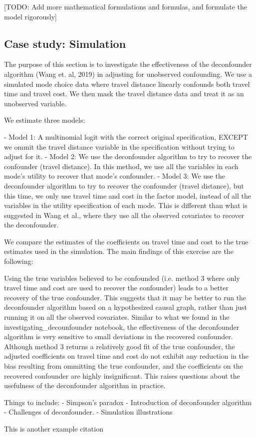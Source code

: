 [TODO: Add more mathematical formulations and formulas, and formulate the model rigorously]

\subsection{Case study: Simulation}

The purpose of this section is to investigate the effectiveness of the deconfounder algorithm (Wang et. al, 2019) in adjusting for unobserved confounding. We use a simulated mode choice data where travel distance linearly confounds both travel time and travel cost. We then mask the travel distance data and treat it as an unobserved variable. 

We estimate three models:

	- Model 1: A multinomial logit with the correct original specification, EXCEPT we ommit the travel distance variable in the specification without trying to adjust for it.
	- Model 2: We use the deconfounder algorithm to try to recover the confounder (travel distance). In this method, we use all the variables in each mode's utility to recover that mode's confounder.
	- Model 3: We use the deconfounder algorithm to try to recover the confounder (travel distance), but this time, we only use travel time and cost in the factor model, instead of all the variables in the utility specification of each mode. This is different than what is suggested in Wang et al., where they use all the observed covariates to recover the deconfounder. 

We compare the estimates of the coefficients on travel time and cost to the true estimates used in the simulation. The main findings of this exercise are the following:

Using the true variables believed to be confounded (i.e. method 3 where only travel time and cost are used to recover the confounder) leads to a better recovery of the true confounder. This suggests that it may be better to run the deconfounder algorithm based on a hypothesized causal graph, rather than just running it on all the observed covariates.
Similar to what we found in the investigating_decounfounder notebook, the effectiveness of the deconfounder algorithm is very sensitive to small deviations in the recovered confounder. Although method 3 returns a relatively good fit of the true confounder, the adjusted coefficients on travel time and cost do not exhibit any reduction in the bias resulting from ommitting the true confounder, and the coefficients on the recovered confounder are highly insignificant. This raises questions about the usefulness of the deconfounder algorithm in practice.




Things to include:
- Simpson's paradox
- Introduction of deconfounder algorithm
- Challenges of deconfounder. 
- Simulation illustrations



\blindtext[2]

This is another example citation \cite{wang_2019_blessings}
